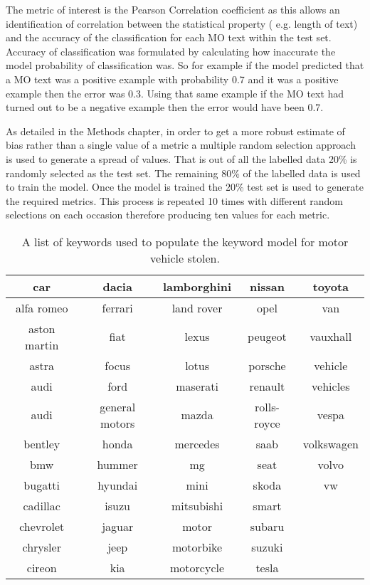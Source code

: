 The metric of interest is the Pearson Correlation coefficient as this allows an identification of correlation between the statistical property ( e.g. length of text) and the accuracy of the classification for each MO text within the test set. Accuracy of classification was formulated by calculating how inaccurate the model probability of classification was. So for example if the model predicted that a MO text was a positive example with probability 0.7 and it was a positive example then the error was 0.3. Using that same example if the MO text had turned out to be a negative example then the error would have been 0.7.

As detailed in the Methods chapter, in order to get a more robust estimate of bias rather than a single value of a metric a multiple random selection approach is used to generate a spread of values. That is out of all the labelled data 20\% is randomly selected as the test set. The remaining 80\% of the labelled data is used to train the model. Once the model is trained the 20\% test set is used to generate the required metrics. This process is repeated 10 times with different random selections on each occasion therefore producing ten values for each metric.  




\begin{table}[]
\begin{tabular}{|c|c|c|c|c|}
\hline
car          & dacia          & lamborghini & nissan      & toyota     \\ \hline
alfa romeo   & ferrari        & land rover  & opel        & van        \\ \hline
aston martin & fiat           & lexus       & peugeot     & vauxhall   \\ \hline
astra        & focus          & lotus       & porsche     &  vehicle  \\ \hline
audi         & ford           & maserati    & renault     &  vehicles    \\ \hline
audi         & general motors & mazda       & rolls-royce & vespa  \\ \hline
bentley      & honda          & mercedes    & saab        & volkswagen      \\ \hline
bmw          & hummer         & mg          & seat        & volvo   \\ \hline
bugatti      & hyundai        & mini        & skoda       & vw       \\ \hline
cadillac     & isuzu          & mitsubishi  & smart       &       \\ \hline
chevrolet    & jaguar         & motor       & subaru      &            \\ \hline
chrysler     & jeep           & motorbike   & suzuki      &            \\ \hline
cireon       & kia            & motorcycle  & tesla       &            \\ \hline
\end{tabular}
\caption[Keywords for keyword model - motor vehicle stolen]{\label{tab:Keywords} A list of keywords used to populate the  keyword model for motor vehicle stolen.}
\end{table}


